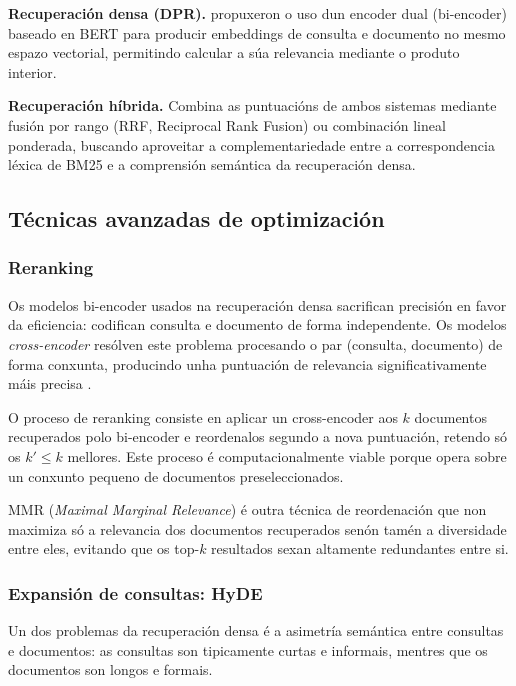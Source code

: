 \documentclass[11pt, a4paper, oneside]{report}
\begin{document}
\textbf{Recuperación densa (DPR).} \citet{karpukhin2020dense} propuxeron o uso dun
encoder dual (bi-encoder) baseado en BERT para producir embeddings de consulta e
documento no mesmo espazo vectorial, permitindo calcular a súa relevancia mediante o
produto interior.

\textbf{Recuperación híbrida.} Combina as puntuacións de ambos sistemas mediante
fusión por rango (RRF, Reciprocal Rank Fusion) ou combinación lineal ponderada,
buscando aproveitar a complementariedade entre a correspondencia léxica de BM25 e a
comprensión semántica da recuperación densa.

\subsection{Técnicas avanzadas de optimización}
\label{sec:tecnicas_avanzadas}

\subsubsection{Reranking}
\label{sec:reranking_teoria}

Os modelos bi-encoder usados na recuperación densa sacrifican precisión en favor da
eficiencia: codifican consulta e documento de forma independente. Os modelos
\textit{cross-encoder} resólven este problema procesando o par (consulta, documento) de
forma conxunta, producindo unha puntuación de relevancia significativamente máis precisa
\citep{nogueira2019passage}.

O proceso de reranking consiste en aplicar un cross-encoder aos $k$ documentos
recuperados polo bi-encoder e reordenalos segundo a nova puntuación, retendo só
os $k' \leq k$ mellores. Este proceso é computacionalmente viable porque opera sobre
un conxunto pequeno de documentos preseleccionados.

MMR (\textit{Maximal Marginal Relevance}) é outra técnica de reordenación que non
maximiza só a relevancia dos documentos recuperados senón tamén a diversidade entre
eles, evitando que os top-$k$ resultados sexan altamente redundantes entre si.

\subsubsection{Expansión de consultas: HyDE}
\label{sec:hyde_teoria}

Un dos problemas da recuperación densa é a asimetría semántica entre consultas e
documentos: as consultas son tipicamente curtas e informais, mentres que os documentos
son longos e formais.
\end{document}
